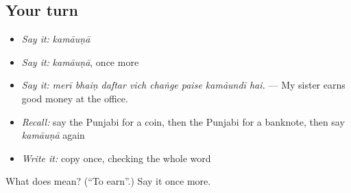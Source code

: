 \subsection*{Your turn}
\begin{itemize}
\raggedright
  \item \emph{Say it:} \emph{kamāuṇā}
  \item \emph{Say it:} \emph{kamāuṇā}, once more
  \item \emph{Say it:} \emph{merī bhaiṇ daftar vich chaṅge paise kamāundī hai.} — My sister earns good money at the office.
  \item \emph{Recall:} say the Punjabi for a coin, then the Punjabi for a banknote, then say \emph{kamāuṇā} again
  \item \emph{Write it:} copy \textbf{} once, checking the whole word
\end{itemize}

\begin{tcolorbox}[breakable,colback=teal!4,colframe=teal!35!black,title={Before you move on}]
What does  mean? (\textquotedblleft{}To earn\textquotedblright{}.) Say it once more.
\end{tcolorbox}
